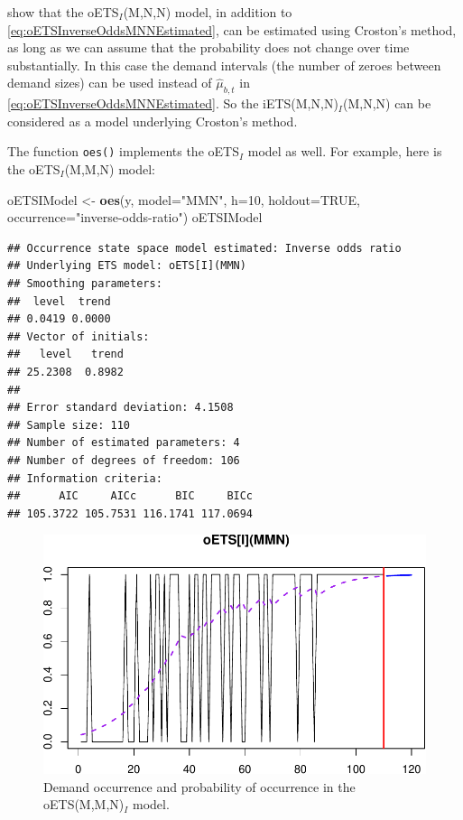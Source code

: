 \documentclass[]{book}
\newenvironment{Shaded}{\begin{snugshade}}{\end{snugshade}}
\newcommand{\DataTypeTok}[1]{\textcolor[rgb]{0.13,0.29,0.53}{#1}}
\newcommand{\DecValTok}[1]{\textcolor[rgb]{0.00,0.00,0.81}{#1}}
\newcommand{\KeywordTok}[1]{\textcolor[rgb]{0.13,0.29,0.53}{\textbf{#1}}}
\newcommand{\NormalTok}[1]{#1}
\newcommand{\OtherTok}[1]{\textcolor[rgb]{0.56,0.35,0.01}{#1}}
\newcommand{\StringTok}[1]{\textcolor[rgb]{0.31,0.60,0.02}{#1}}
\theoremstyle{definition}
\theoremstyle{definition}
\theoremstyle{definition}
\theoremstyle{definition}
\theoremstyle{remark}
\begin{document}
\citet{Svetunkov2019a} show that the oETS\(_I\)(M,N,N) model, in addition to \eqref{eq:oETSInverseOddsMNNEstimated}, can be estimated using Croston's method, as long as we can assume that the probability does not change over time substantially. In this case the demand intervals (the number of zeroes between demand sizes) can be used instead of \(\hat{\mu}_{b,t}\) in \eqref{eq:oETSInverseOddsMNNEstimated}. So the iETS(M,N,N)\(_I\)(M,N,N) can be considered as a model underlying Croston's method.

The function \texttt{oes()} implements the oETS\(_I\) model as well. For example, here is the oETS\(_I\)(M,M,N) model:

\begin{Shaded}
\begin{Highlighting}[]
\NormalTok{oETSIModel <-}\StringTok{ }\KeywordTok{oes}\NormalTok{(y, }\DataTypeTok{model=}\StringTok{"MMN"}\NormalTok{, }\DataTypeTok{h=}\DecValTok{10}\NormalTok{, }\DataTypeTok{holdout=}\OtherTok{TRUE}\NormalTok{,}
                  \DataTypeTok{occurrence=}\StringTok{"inverse-odds-ratio"}\NormalTok{)}
\NormalTok{oETSIModel}
\end{Highlighting}
\end{Shaded}

\begin{verbatim}
## Occurrence state space model estimated: Inverse odds ratio
## Underlying ETS model: oETS[I](MMN)
## Smoothing parameters:
##  level  trend 
## 0.0419 0.0000 
## Vector of initials:
##   level   trend 
## 25.2308  0.8982 
## 
## Error standard deviation: 4.1508
## Sample size: 110
## Number of estimated parameters: 4
## Number of degrees of freedom: 106
## Information criteria: 
##      AIC     AICc      BIC     BICc 
## 105.3722 105.7531 116.1741 117.0694
\end{verbatim}

\begin{figure}
\centering
\includegraphics{Svetunkov--2022----ADAM_files/figure-latex/oETSIModel-1.pdf}
\caption{\label{fig:oETSIModel}Demand occurrence and probability of occurrence in the oETS(M,M,N)\(_I\) model.}
\end{figure}
\end{document}
